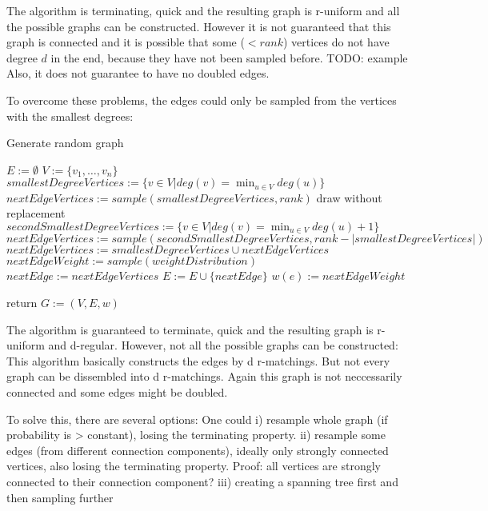 The algorithm is terminating, quick and the resulting graph is r-uniform and all the possible graphs can be constructed.
However it is not guaranteed that this graph is connected and it is possible that some ($< rank$) vertices do not have degree $d$ in the end, because they have not been sampled before. TODO: example
Also, it does not guarantee to have no doubled edges.

To overcome these problems, the edges could only be sampled from the vertices with the smallest degrees:

\begin{algorithm}[h!]
	\caption{Generate random graph} 
	\begin{algorithmic}
		\State $E := \emptyset$
		\State $V := \{v_1, \ldots, v_n\}$
		\State $ smallestDegreeVertices := \{v\in V| deg(v) = \min_{u\in V} deg(u) \}$
		\State $nextEdgeVertices := sample(smallestDegreeVertices, rank) $ \Comment draw without replacement
		\Else
		\State $secondSmallestDegreeVertices := \{v\in V| deg(v) = \min_{u\in V} deg(u) +1 \}$
		\State $nextEdgeVertices :=  sample(secondSmallestDegreeVertices, rank - | smallestDegreeVertices|)$
		\State $nextEdgeVertices := smallestDegreeVertices \cup nextEdgeVertices  $
		\EndIf
		\State $nextEdgeWeight := sample(weightDistribution)$ 
		\State $nextEdge := nextEdgeVertices$
		\State $E := E \cup \{nextEdge\}$
		\State $w(e):= nextEdgeWeight$
		
		\EndWhile
		\State return $G:=(V,E, w)$	
		\EndFunction 
	\end{algorithmic}
\end{algorithm}	

The algorithm is guaranteed to terminate, quick and the resulting graph is r-uniform and d-regular.
However, not all the possible graphs can be constructed: This algorithm basically constructs the edges by d r-matchings. But not every graph can be dissembled into d r-matchings.
Again this graph is not neccessarily connected and some edges might be doubled.

To solve this, there are several options:
One could i) resample whole graph (if probability is > constant), losing the terminating property.
ii) resample some edges (from different connection components), ideally only strongly connected vertices, also losing the terminating property. Proof: all vertices are strongly connected to their connection component?
iii) creating a spanning tree first and then sampling further

